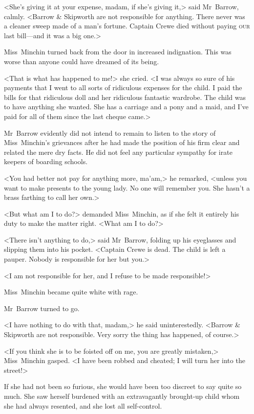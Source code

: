<She's giving it at your expense, madam, if she's giving it,> said Mr~Barrow, calmly. <Barrow \& Skipworth are not responsible for anything. There never was a cleaner sweep made of a man's fortune. Captain Crewe died without paying \textsc{our} last bill—and it was a big one.>

Miss~Minchin turned back from the door in increased indignation. This was worse than anyone could have dreamed of its being.

<That is what has happened to me!> she cried. <I was always so sure of his payments that I went to all sorts of ridiculous expenses for the child. I paid the bills for that ridiculous doll and her ridiculous fantastic wardrobe. The child was to have anything she wanted. She has a carriage and a pony and a maid, and I've paid for all of them since the last cheque came.>

Mr~Barrow evidently did not intend to remain to listen to the story of Miss~Minchin's grievances after he had made the position of his firm clear and related the mere dry facts. He did not feel any particular sympathy for irate keepers of boarding schools.

<You had better not pay for anything more, ma'am,> he remarked, <unless you want to make presents to the young lady. No one will remember you. She hasn't a brass farthing to call her own.>

<But what am I to do?> demanded Miss~Minchin, as if she felt it entirely his duty to make the matter right. <What am I to do?>

<There isn't anything to do,> said Mr~Barrow, folding up his eyeglasses and slipping them into his pocket. <Captain Crewe is dead. The child is left a pauper. Nobody is responsible for her but you.>

<I am not responsible for her, and I refuse to be made responsible!>

Miss~Minchin became quite white with rage.

Mr~Barrow turned to go.

<I have nothing to do with that, madam,> he said uninterestedly. <Barrow \& Skipworth are not responsible. Very sorry the thing has happened, of course.>

<If you think she is to be foisted off on me, you are greatly mistaken,> Miss~Minchin gasped. <I have been robbed and cheated; I will turn her into the street!>

If she had not been so furious, she would have been too discreet to say quite so much. She saw herself burdened with an extravagantly brought-up child whom she had always resented, and she lost all self-control.

